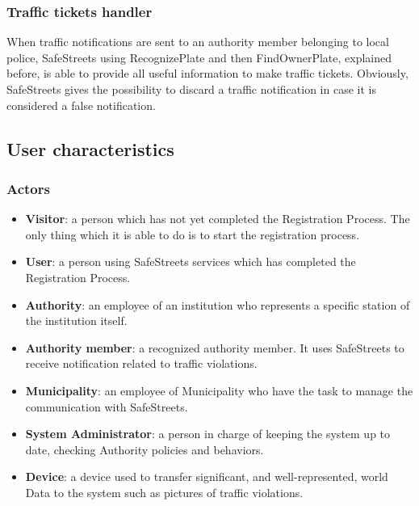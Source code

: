 \documentclass[12pt]{article}
\begin{document}
\subsubsection{Traffic tickets handler}
\vspace{2mm}
When traffic notifications are sent to an authority member belonging to local police, SafeStreets using RecognizePlate and then FindOwnerPlate, explained before, is able to provide all useful information to make traffic tickets. Obviously, SafeStreets gives the possibility to discard a traffic notification in case it is considered a false notification.

\subsection{User characteristics}
\vspace{5mm}
\subsubsection{Actors}
\vspace{2mm}
\begin{itemize}
\item \textbf{Visitor}: a person which has not yet completed the Registration Process. The only thing which it is able to do is to start the registration process. 

\item \textbf{User}: a person using SafeStreets services which has completed the Registration Process. 

\item \textbf{Authority}: an employee of an institution who represents a specific station of the institution itself. 

\item \textbf{Authority member}: a recognized authority member. It uses SafeStreets to receive notification related to traffic violations.

\item \textbf{Municipality}: an employee of Municipality who have the task to manage the communication with SafeStreets.

\item \textbf{System Administrator}: a person in charge of keeping the system up to date, checking Authority policies and behaviors.

\item \textbf{Device}: a device used to transfer significant, and well-represented, world Data to the system such as pictures of traffic violations.
\end{itemize}
\end{document}
